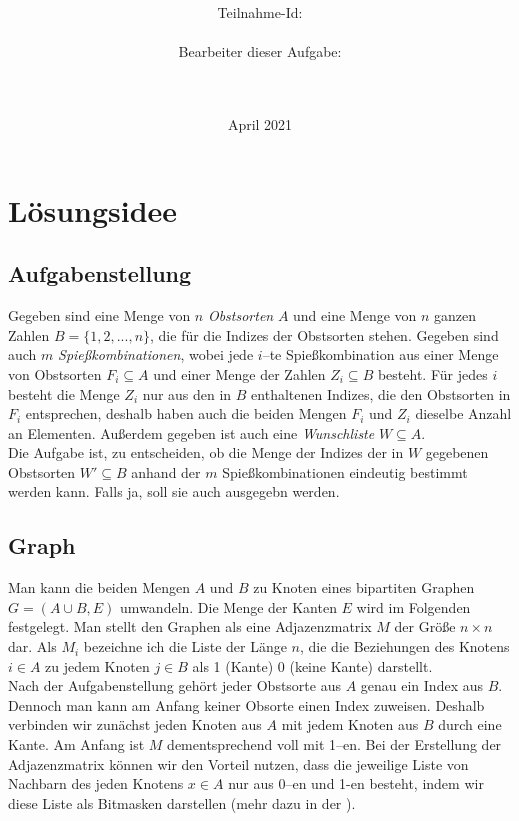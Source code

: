 \documentclass[a4paper,10pt,ngerman]{scrartcl}
\title{\textbf{\Huge\Aufgabe}}
\author{\LARGE Teilnahme-Id: \LARGE \TeilnahmeId \\\\
	    \LARGE Bearbeiter dieser Aufgabe: \\ 
	    \LARGE \Namen\\\\}
\date{\LARGE April 2021}
\newcommand{\TODO}[1]{\todo[inline]{TODO: #1}}
\begin{document}
\maketitle
\tableofcontents

\vspace{0.5cm}

\section{Lösungsidee}
\subsection{Aufgabenstellung}
Gegeben sind eine Menge von $n$ \textit{Obstsorten} $A$ und eine Menge von $n$ ganzen Zahlen $B = \{1, 2, ..., n\}$,
die für die Indizes der Obstsorten stehen.
Gegeben sind auch $m$ \textit{Spießkombinationen}, wobei jede $i$--te Spießkombination
aus einer Menge von Obstsorten $F_i \subseteq A$ und einer Menge der Zahlen $Z_i \subseteq B$ besteht. 
Für jedes $i$ besteht die Menge $Z_i$ nur aus
den in $B$ enthaltenen Indizes, die den Obstsorten in $F_i$ entsprechen, deshalb haben auch die beiden Mengen
$F_i$ und $Z_i$ dieselbe Anzahl an Elementen.
Außerdem gegeben ist auch eine \textit{Wunschliste} $W \subseteq A$.\\
Die Aufgabe ist, zu entscheiden,
ob die Menge der Indizes der in $W$ gegebenen Obstsorten $W' \subseteq B$ anhand der $m$ 
Spießkombinationen eindeutig bestimmt werden kann. Falls ja, soll sie auch ausgegebn werden.

\subsection{Graph}
\TODO{\\Name ändern\\Bild}

Man kann die beiden Mengen $A$ und $B$ zu Knoten eines bipartiten Graphen $G = (A \cup B, E)$ umwandeln.
Die Menge der Kanten $E$ wird im Folgenden festgelegt.
Man stellt den Graphen als eine Adjazenzmatrix $M$ der Größe $n \times n$ dar. 
Als $M_i$ bezeichne ich die Liste der Länge $n$, die die Beziehungen des Knotens $i \in A$ zu jedem Knoten 
$j \in B$ als 1 (Kante) 0 (keine Kante) darstellt.\\
Nach der Aufgabenstellung gehört jeder Obstsorte aus $A$ genau ein Index aus $B$.
Dennoch man kann am Anfang keiner Obsorte einen Index zuweisen.
Deshalb verbinden wir zunächst jeden Knoten aus $A$ mit jedem Knoten aus $B$ durch eine Kante.
Am Anfang ist $M$ dementsprechend voll mit 1--en.
Bei der Erstellung der Adjazenzmatrix können wir den Vorteil nutzen, dass die jeweilige 
Liste von Nachbarn des jeden Knotens $x \in A$ nur aus 0--en und 1-en besteht, indem
wir diese Liste als Bitmasken darstellen (mehr dazu in der ).
\end{document}
